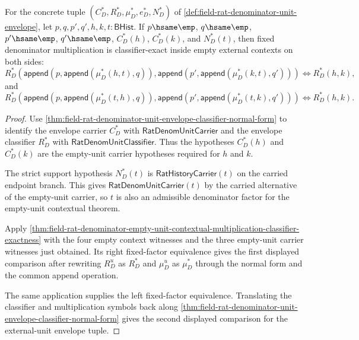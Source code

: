 \begin{theorem}
\label{thm:field-rat-denominator-external-unit-envelope-contextual-multiplication-exactness}
For the concrete tuple
$(C_D^\ast,R_D^\ast,\mu_D^\ast,e_D^\ast,N_D^\ast)$ of
\autoref{def:field-rat-denominator-unit-envelope}, let
$p,q,p',q',h,k,t:\mathsf{BHist}$. If $p\hsame\emp$, $q\hsame\emp$,
$p'\hsame\emp$, $q'\hsame\emp$, $C_D^\ast(h)$, $C_D^\ast(k)$, and
$N_D^\ast(t)$, then fixed denominator multiplication is classifier-exact
inside empty external contexts on both sides:
$$
R_D^\ast(\mathsf{append}(p,\mathsf{append}(\mu_D^\ast(h,t),q)),
\mathsf{append}(p',\mathsf{append}(\mu_D^\ast(k,t),q')))
\Longleftrightarrow R_D^\ast(h,k),
$$
and
$$
R_D^\ast(\mathsf{append}(p,\mathsf{append}(\mu_D^\ast(t,h),q)),
\mathsf{append}(p',\mathsf{append}(\mu_D^\ast(t,k),q')))
\Longleftrightarrow R_D^\ast(h,k).
$$
\end{theorem}
\begin{proof}
Use
\autoref{thm:field-rat-denominator-unit-envelope-classifier-normal-form} to
identify the envelope carrier $C_D^\ast$ with
$\mathsf{RatDenomUnitCarrier}$ and the envelope classifier $R_D^\ast$ with
$\mathsf{RatDenomUnitClassifier}$. Thus the hypotheses $C_D^\ast(h)$ and
$C_D^\ast(k)$ are the empty-unit carrier hypotheses required for $h$ and $k$.

The strict support hypothesis $N_D^\ast(t)$ is
$\mathsf{RatHistoryCarrier}(t)$ on the carried endpoint branch. This gives
$\mathsf{RatDenomUnitCarrier}(t)$ by the carried alternative of the empty-unit
carrier, so $t$ is also an admissible denominator factor for the empty-unit
contextual theorem.

Apply
\autoref{thm:field-rat-denominator-empty-unit-contextual-multiplication-classifier-exactness}
with the four empty context witnesses and the three empty-unit carrier
witnesses just obtained. Its right fixed-factor equivalence gives the first
displayed comparison after rewriting $R_D^u$ as $R_D^\ast$ and
$\mu_D^u$ as $\mu_D^\ast$ through the normal form and the common append
operation.

The same application supplies the left fixed-factor equivalence. Translating
the classifier and multiplication symbols back along
\autoref{thm:field-rat-denominator-unit-envelope-classifier-normal-form}
gives the second displayed comparison for the external-unit envelope tuple.
\end{proof}

